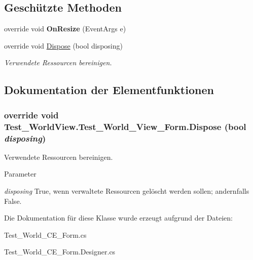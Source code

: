 \subsection*{Geschützte Methoden}
\begin{DoxyCompactItemize}
\item 
\hypertarget{class_test___world_view_1_1_test___world___view___form_ad830eaa7ae6426728e0d67a92dcaeb25}{
override void {\bfseries OnResize} (EventArgs e)}
\label{class_test___world_view_1_1_test___world___view___form_ad830eaa7ae6426728e0d67a92dcaeb25}

\item 
override void \hyperlink{class_test___world_view_1_1_test___world___view___form_a58c32471c42109624080524e42837cf0}{Dispose} (bool disposing)
\begin{DoxyCompactList}\small\item\em Verwendete Ressourcen bereinigen. \item\end{DoxyCompactList}\end{DoxyCompactItemize}


\subsection{Dokumentation der Elementfunktionen}
\hypertarget{class_test___world_view_1_1_test___world___view___form_a58c32471c42109624080524e42837cf0}{
\subsubsection[{Dispose}]{\setlength{\rightskip}{0pt plus 5cm}override void Test\_\-WorldView.Test\_\-World\_\-View\_\-Form.Dispose (bool {\em disposing})}}
\label{class_test___world_view_1_1_test___world___view___form_a58c32471c42109624080524e42837cf0}


Verwendete Ressourcen bereinigen. 


\begin{DoxyParams}{Parameter}
\item[{\em disposing}]True, wenn verwaltete Ressourcen gelöscht werden sollen; andernfalls False.\end{DoxyParams}


Die Dokumentation für diese Klasse wurde erzeugt aufgrund der Dateien:\begin{DoxyCompactItemize}
\item 
Test\_\-World\_\-CE\_\-Form.cs\item 
Test\_\-World\_\-CE\_\-Form.Designer.cs\end{DoxyCompactItemize}
